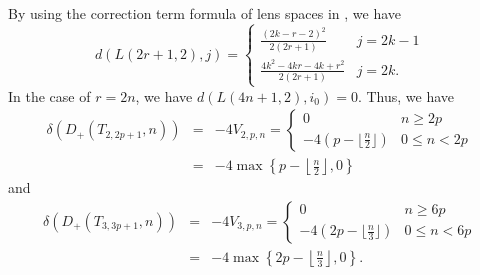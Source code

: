 \documentclass[11pt]{amsart}
\begin{document}
By using the correction term formula of lens spaces in \cite{MT}, we have 
\begin{equation}d(L(2r+1,2),j)=\begin{cases}\frac{(2k-r-2)^2}{2(2r+1)}&j=2k-1\\\frac{4k^2-4kr-4k+r^2}{2(2r+1)}&j=2k.\end{cases}\label{L2formula}
\end{equation}
In the case of $r=2n$, we have $d(L(4n+1,2),i_0)=0$.
Thus, we have 
\begin{eqnarray*}
\delta(D_+(T_{2,2p+1},n))&=&-4V_{2,p,n}=\begin{cases}0&n\ge 2p\\-4(p-\lfloor\frac{n}{2}\rfloor)&0\le n<2p\end{cases}\\
&=&-4\max\left\{p-\left\lfloor\frac{n}{2}\right\rfloor,0\right\}\end{eqnarray*}
and
\begin{eqnarray*}
\delta(D_+(T_{3,3p+1},n))&=&-4V_{3,p,n}=\begin{cases}0&n\ge 6p\\-4(2p-\lfloor\frac{n}{3}\rfloor)&0\le n<6p\end{cases}\\
&=&-4\max\left\{2p-\left\lfloor\frac{n}{3}\right\rfloor,0\right\}.\end{eqnarray*}
\end{document}
